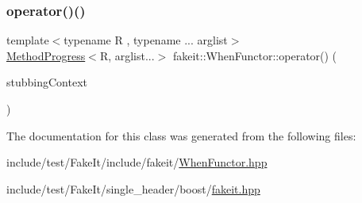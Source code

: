 \subsubsection{\texorpdfstring{operator()()}{operator()()}\hspace{0.1cm}{\footnotesize\ttfamily [9/9]}}
{\footnotesize\ttfamily template$<$typename R , typename ... arglist$>$ \\
\mbox{\hyperlink{structfakeit_1_1WhenFunctor_1_1MethodProgress}{Method\+Progress}}$<$R, arglist...$>$ fakeit\+::\+When\+Functor\+::operator() (\begin{DoxyParamCaption}\item[{const \mbox{\hyperlink{structfakeit_1_1StubbingContext}{Stubbing\+Context}}$<$ R, arglist... $>$ \&}]{stubbing\+Context }\end{DoxyParamCaption})\hspace{0.3cm}{\ttfamily [inline]}}



The documentation for this class was generated from the following files\+:\begin{DoxyCompactItemize}
\item 
include/test/\+Fake\+It/include/fakeit/\mbox{\hyperlink{WhenFunctor_8hpp}{When\+Functor.\+hpp}}\item 
include/test/\+Fake\+It/single\+\_\+header/boost/\mbox{\hyperlink{single__header_2boost_2fakeit_8hpp}{fakeit.\+hpp}}\end{DoxyCompactItemize}
